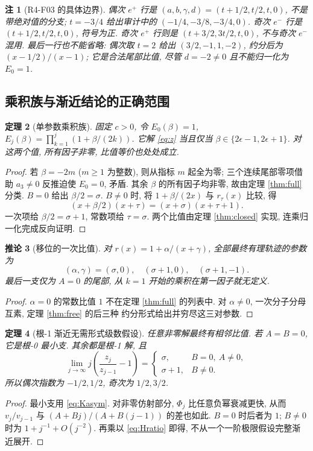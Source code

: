 \documentclass[UTF8]{ctexart}
\newtheorem{theorem}{定理}[section]
\newtheorem{corollary}[theorem]{推论}
\newtheorem{remark}[theorem]{注}
\newcommand{\eps}{\epsilon}
\newcommand{\sig}{\sigma}
\begin{document}
\begin{remark}[R4-F03 的具体边界]
 偶次 $e^+$ 行是 $(a,b,\gamma,d)=(t+1/2,t/2,t,0)$,
 不是带绝对值的分支; $t=-3/4$ 给出审计中的
 $(-1/4,-3/8,-3/4,0)$.
 奇次 $e^-$ 行是 $(t+1/2,t/2,t,0)$, 符号为正.
 奇次 $e^+$ 行则是 $(t+3/2,3t/2,t,0)$, 不与奇次 $e^-$ 混用.
 最后一行也不能省略: 偶次取 $t=2$ 给出
 $(3/2,-1,1,-2)$, 约分后为 $(x-1/2)/(x-1)$;
 它是合法尾部比值, 尽管 $d=-2\ne0$ 且不能归一化为 $E_0=1$.
\end{remark}

\subsection{乘积族与渐近结论的正确范围}

\begin{theorem}[单参数乘积族]\label{thm:beta}
 固定 $c>0$, 令 $E_0(\beta)=1$,
 $E_j(\beta)=\prod_{k=1}^j(1+\beta/(2k))$.
 它解 \eqref{eq:z} 当且仅当
 $\beta\in\{2\eps-1,2\eps+1\}$.
 对这两个值, 所有因子非零, 比值等价也处处成立.
\end{theorem}
\begin{proof}
 若 $\beta=-2m$ ($m\ge1$ 为整数), 则从指标 $m$ 起全为零;
 三个连续尾部零项借助 $a_3\ne0$ 反推迫使 $E_0=0$, 矛盾.
 其余 $\beta$ 的所有因子均非零, 故由定理 \ref{thm:full} 分类.
 $B=0$ 给出 $\beta/2=\sig$.
 $B\ne0$ 时, 将 $1+\beta/(2x)$ 与 $r_\tau(x)$ 比较, 得
\[
 (x+\beta/2)(x+\tau)=(x+\sig)(x+\tau+1).
\]
 一次项给 $\beta/2=\sig+1$, 常数项给 $\tau=\sig$.
 两个比值由定理 \ref{thm:closed} 实现, 连乘归一化完成反向证明.
\end{proof}

\begin{corollary}[移位的一次比值]
 对 $r(x)=1+\alpha/(x+\gamma)$, 全部最终有理轨迹的参数为
\[
 (\alpha,\gamma)=(\sig,0),\quad(\sig+1,0),\quad(\sig+1,-1).
\]
 最后一支仅为 $A=0$ 的尾部, 从 $k=1$ 开始的乘积在第一因子就无定义.
\end{corollary}
\begin{proof}
 $\alpha=0$ 的常数比值 $1$ 不在定理 \ref{thm:full} 的列表中.
 对 $\alpha\ne0$, 一次分子分母互素, 定理 \ref{thm:free} 的后三种
 约分形式给出并穷尽这三对参数.
\end{proof}

\begin{theorem}[根-1 渐近无需形式级数假设]\label{thm:asym}
 任意非零解最终有相邻比值. 若 $A=B=0$, 它是根-0 最小支.
 其余都是根-1 解, 且
\[
 \lim_{j\to\infty}j\left(\frac{z_j}{z_{j-1}}-1\right)
 =\begin{cases}\sig,&B=0,\ A\ne0,\\\sig+1,&B\ne0.\end{cases}
\]
 所以偶次指数为 $-1/2,1/2$, 奇次为 $1/2,3/2$.
\end{theorem}
\begin{proof}
 最小支用 \eqref{eq:Kasym}. 对非零仿射部分,
 $\Phi_j$ 比任意负幂衰减更快, 从而
 $v_j/v_{j-1}$ 与 $(A+Bj)/(A+B(j-1))$ 的差也如此.
 $B=0$ 时后者为 $1$; $B\ne0$ 时为 $1+j^{-1}+O(j^{-2})$.
 再乘以 \eqref{eq:Hratio} 即得, 不从一个一阶极限假设完整渐近展开.
\end{proof}
\end{document}
